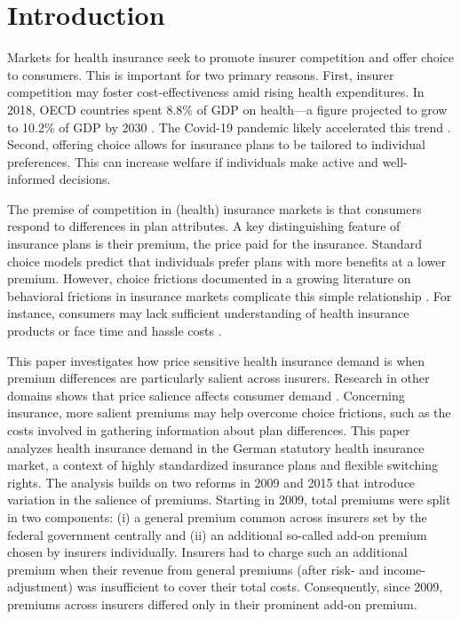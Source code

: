 \documentclass[a4paper, 11pt, english]{article}
\begin{document}
\vspace{3em}


\newpage
\setcounter{page}{1}



\section{Introduction}

Markets for health insurance seek to promote insurer competition and offer choice to consumers. This is important for two primary reasons. First, insurer competition may foster cost-effectiveness amid rising health expenditures. In 2018, OECD countries spent 8.8\% of GDP on health---a figure projected to grow to 10.2\% of GDP by 2030 \citep{OECDhealth2019}. The Covid-19 pandemic likely accelerated this trend \citep{OECDhealthStats2022}. Second, offering choice allows for insurance plans to be tailored to individual preferences. This can increase welfare if individuals make active and well-informed decisions.

The premise of competition in (health) insurance markets is that consumers respond to differences in plan attributes. A key distinguishing feature of insurance plans is their premium, the price paid for the insurance. Standard choice models predict that individuals prefer plans with more benefits at a lower premium. However, choice frictions documented in a growing literature on behavioral frictions in insurance markets complicate this simple relationship \citep[e.g.,][for reviews]{Ericson2017, Chandra2019}. For instance, consumers may lack sufficient understanding of health insurance products or face time and hassle costs \citep{Handel2015}. 

This paper investigates how price sensitive health insurance demand is when premium differences are particularly salient across insurers. Research in other domains shows that price salience affects consumer demand \citep[e.g.,][]{chetty2009}. Concerning insurance, more salient premiums may help overcome choice frictions, such as the costs involved in gathering information about plan differences. This paper analyzes health insurance demand in the German statutory health insurance market, a context of highly standardized insurance plans and flexible switching rights. The analysis builds on two reforms in 2009 and 2015 that introduce variation in the salience of premiums. Starting in 2009, total premiums were split in two components: (i) a general premium common across insurers set by the federal government centrally and (ii) an additional so-called add-on premium chosen by insurers individually. Insurers had to charge such an additional premium when their revenue from general premiums (after risk- and income-adjustment) was insufficient to cover their total costs. Consequently, since 2009, premiums across insurers differed only in their prominent add-on premium.
\end{document}
